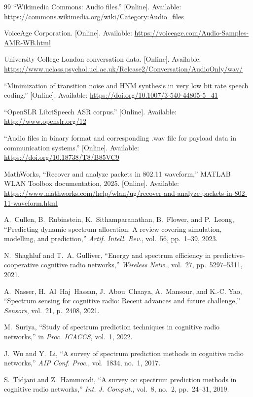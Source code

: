 \documentclass[lettersize,journal]{IEEEtran}
\begin{document}
\begin{thebibliography}{99}
 ``Wikimedia Commons: Audio files.'' [Online]. Available: \url{https://commons.wikimedia.org/wiki/Category:Audio_files}

 VoiceAge Corporation. [Online]. Available: \url{https://voiceage.com/Audio-Samples-AMR-WB.html}

 University College London conversation data. [Online]. Available: \url{https://www.uclass.psychol.ucl.ac.uk/Release2/Conversation/AudioOnly/wav/}

 ``Minimization of transition noise and HNM synthesis in very low bit rate speech coding.'' [Online]. Available: \url{https://doi.org/10.1007/3-540-44805-5_41}

 ``OpenSLR LibriSpeech ASR corpus.'' [Online]. Available: \url{http://www.openslr.org/12}

 ``Audio files in binary format and corresponding .wav file for payload data in communication systems.'' [Online]. Available: \url{https://doi.org/10.18738/T8/B85VC9}

 MathWorks, ``Recover and analyze packets in 802.11 waveform,'' MATLAB WLAN Toolbox documentation, 2025. [Online]. Available: \url{https://www.mathworks.com/help/wlan/ug/recover-and-analyze-packets-in-802-11-waveform.html}

 A.~Cullen, B.~Rubinstein, K.~Sithamparanathan, B.~Flower, and P.~Leong, ``Predicting dynamic spectrum allocation: A review covering simulation, modelling, and prediction,'' \emph{Artif. Intell. Rev.}, vol.~56, pp.~1--39, 2023.

 N.~Shaghluf and T.~A. Gulliver, ``Energy and spectrum efficiency in predictive-cooperative cognitive radio networks,'' \emph{Wireless Netw.}, vol.~27, pp.~5297--5311, 2021.

 A.~Nasser, H.~Al~Haj~Hassan, J.~Abou~Chaaya, A.~Mansour, and K.-C. Yao, ``Spectrum sensing for cognitive radio: Recent advances and future challenge,'' \emph{Sensors}, vol.~21, p.~2408, 2021.

 M.~Suriya, ``Study of spectrum prediction techniques in cognitive radio networks,'' in \emph{Proc. ICACCS}, vol.~1, 2022.

 J.~Wu and Y.~Li, ``A survey of spectrum prediction methods in cognitive radio networks,'' \emph{AIP Conf. Proc.}, vol.~1834, no.~1, 2017.

 S.~Tidjani and Z.~Hammoudi, ``A survey on spectrum prediction methods in cognitive radio networks,'' \emph{Int. J. Comput.}, vol.~8, no.~2, pp.~24--31, 2019.


\end{thebibliography}
\end{document}
